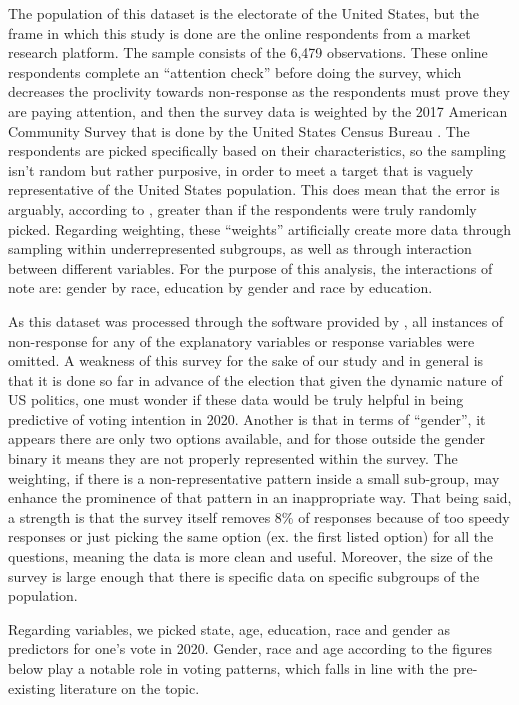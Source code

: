 \documentclass[
]{article}
\begin{document}
The population of this dataset is the electorate of the United States, but the frame in which this study is done are the online respondents from a market research platform. The sample consists of the 6,479 observations. These online respondents complete an ``attention check'' before doing the survey, which decreases the proclivity towards non-response as the respondents must prove they are paying attention, and then the survey data is weighted by the 2017 American Community Survey that is done by the United States Census Bureau \citep{citeSurvey}. The respondents are picked specifically based on their characteristics, so the sampling isn't random but rather purposive, in order to meet a target that is vaguely representative of the United States population. This does mean that the error is arguably, according to \citet{citeSurvey}, greater than if the respondents were truly randomly picked. Regarding weighting, these ``weights'' artificially create more data through sampling within underrepresented subgroups, as well as through interaction between different variables. For the purpose of this analysis, the interactions of note are: gender by race, education by gender and race by education.

As this dataset was processed through the software provided by \citet{citeR}, all instances of non-response for any of the explanatory variables or response variables were omitted. A weakness of this survey for the sake of our study and in general is that it is done so far in advance of the election that given the dynamic nature of US politics, one must wonder if these data would be truly helpful in being predictive of voting intention in 2020. Another is that in terms of ``gender'', it appears there are only two options available, and for those outside the gender binary it means they are not properly represented within the survey. The weighting, if there is a non-representative pattern inside a small sub-group, may enhance the prominence of that pattern in an inappropriate way. That being said, a strength is that the survey itself removes 8\% of responses because of too speedy responses or just picking the same option (ex. the first listed option) for all the questions, meaning the data is more clean and useful. Moreover, the size of the survey is large enough that there is specific data on specific subgroups of the population.

Regarding variables, we picked state, age, education, race and gender as predictors for one's vote in 2020. Gender, race and age according to the figures below play a notable role in voting patterns, which falls in line with the pre-existing literature on the topic.
\end{document}
